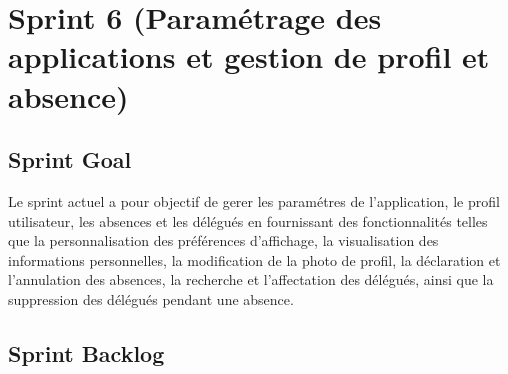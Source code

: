 \section{Sprint 6 (Paramétrage des applications et gestion de profil et absence)}

\subsection{Sprint Goal}
Le sprint actuel a pour objectif de gerer les paramétres de l'application, le profil utilisateur, les absences et les délégués en fournissant des fonctionnalités telles que la personnalisation des préférences d'affichage, la visualisation des informations personnelles, la modification de la photo de profil, la déclaration et l'annulation des absences, la recherche et l'affectation des délégués, ainsi que la suppression des délégués pendant une absence.

\subsection{Sprint Backlog}


